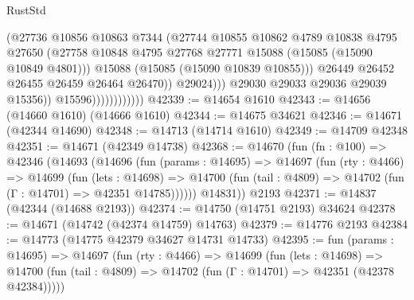 \begin{lexlean}{RustStd}
\begin{coremodule}
                                        (@27736
                                          @10856
                                          @10863
                                          @7344
                                          (@27744
                                            @10855
                                            @10862
                                            @4789
                                            @10838
                                            @4795
                                            @27650
                                            (@27758
                                              @10848
                                              @4795
                                              @27768
                                              @27771
                                              @15088
                                              (@15085 (@15090 @10849 @4801)))
                                            @15088
                                            (@15085 (@15090 @10839 @10855)))
                                          @26449
                                          @26452
                                          @26455
                                          @26459
                                          @26464
                                          @26470))
                                      @29024)))
                                @29030
                                @29033
                                @29036
                                @29039
                                @15356))
                            @15596))))))))))))
@42339 := @14654 @1610
@42343 := @14656 (@14660 @1610) (@14666 @1610)
@42344 := @14675 @34621
@42346 := @14671 (@42344 @14690)
@42348 := @14713 (@14714 @1610)
@42349 := @14709 @42348
@42351 := @14671 (@42349 @14738)
@42368 := @14670
    (fun (fn : @100) =>
    @42346
      (@14693
        (@14696
          (fun (params : @14695) =>
          @14697
            (fun (rty : @4466) =>
            @14699
              (fun (lets : @14698) =>
              @14700 (fun (tail : @4809) => @14702 (fun (Γ : @14701) => @42351 @14785))))))
        @14831))
    @2193
@42371 := @14837 (@42344 (@14688 @2193))
@42374 := @14750 (@14751 @2193) @34624
@42378 := @14671 (@14742 (@42374 @14759) @14763)
@42379 := @14776 @2193
@42384 := @14773 (@14775 @42379 @34627 @14731 @14733)
@42395 := fun (params : @14695) =>
  @14697
    (fun (rty : @4466) =>
    @14699
      (fun (lets : @14698) =>
      @14700 (fun (tail : @4809) => @14702 (fun (Γ : @14701) => @42351 (@42378 @42384)))))

\end{coremodule}
\end{lexlean}
